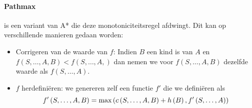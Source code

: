 \paragraph{Pathmax}
 is een variant van A* die deze monotoniciteitsregel afdwingt. Dit kan op verschillende manieren gedaan worden:
\begin{itemize}
 \item Corrigeren van de waarde van $f$: Indien $B$ een kind is van $A$ en $f\left(S,\ldots,A,B\right)<f\left(S,\ldots,A,\right)$ dan nemen we voor $f\left(S,\ldots,A,B\right)$ dezelfde waarde als $f\left(S,\ldots,A\right)$.
 \item $f$ herdefiniëren: we genereren zelf een functie $f'$ die we definiëren als
\begin{equation}
f'\left(S,\ldots,A,B\right)=\mbox{max}\left( c\left(S,\ldots,A,B\right)+h\left(B\right),f'\left(S,\ldots,A\right) \right)
\end{equation}
\end{itemize}

